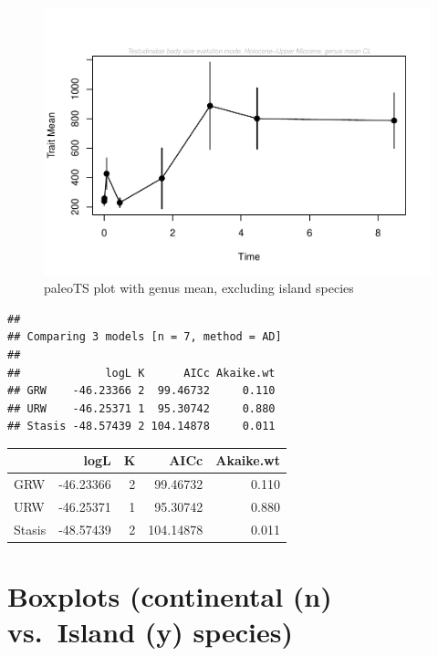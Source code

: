\documentclass[]{article}
\begin{document}
\begin{figure}[htbp]
\centering
\includegraphics{MA_JJ_files/figure-latex/paleoTS plot with genus mean, excluding island species-1.pdf}
\caption{paleoTS plot with genus mean, excluding island species}
\end{figure}

\begin{verbatim}
## 
## Comparing 3 models [n = 7, method = AD]
## 
##             logL K      AICc Akaike.wt
## GRW    -46.23366 2  99.46732     0.110
## URW    -46.25371 1  95.30742     0.880
## Stasis -48.57439 2 104.14878     0.011
\end{verbatim}

\begin{longtable}[]{@{}lrrrr@{}}
\toprule
& logL & K & AICc & Akaike.wt\tabularnewline
\midrule
\endhead
GRW & -46.23366 & 2 & 99.46732 & 0.110\tabularnewline
URW & -46.25371 & 1 & 95.30742 & 0.880\tabularnewline
Stasis & -48.57439 & 2 & 104.14878 & 0.011\tabularnewline
\bottomrule
\end{longtable}

\newpage

\section{Boxplots (continental (n) vs.~Island (y)
species)}\label{boxplots-continental-n-vs.island-y-species}
\end{document}
